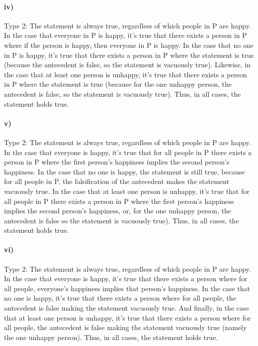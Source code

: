 \documentclass[10pt,letter]{article}
\begin{document}
\paragraph{iv)} Type 2: The statement is always true, regardless of which people in P are happy. In the case that everyone in P is happy, it's true that there exists a person in P where if the person is happy, then everyone in P is happy. In the case that no one in P is happy, it's true that there exists a person in P where the statement is true (because the antecedent is false, so the statement is vacuously true). Likewise, in the case that at least one person is unhappy, it's true that there exists a person in P where the statement is true (because for the one unhappy person, the antecedent is false, so the statement is vacuously true). Thus, in all cases, the statement holds true.

\paragraph{v)} Type 2: The statement is always true, regardless of which people in P are happy. In the case that everyone is happy, it's true that for all people in P there exists a person in P where the first person's happiness implies the second person's happiness. In the case that no one is happy, the statement is still true, because for all people in P, the falsification of the antecedent makes the statement vacuously true. In the case that at least one person is unhappy, it's true that for all people in P there exists a person in P where the first person's happiness implies the second person's happiness, or, for the one unhappy person, the antecedent is false so the statement is vacuously true). Thus, in all cases, the statement holds true.

\paragraph{vi)} Type 2: The statement is always true, regardless of which people in P are happy. In the case that everyone is happy, it's true that there exists a person where for all people, everyone's happiness implies that person's happiness. In the case that no one is happy, it's true that there exists a person where for all people, the antecedent is false making the statement vacuously true. And finally, in the case that at least one person is unhappy, it's true that there exists a person where for all people, the antecedent is false making the statement vacuously true (namely the one unhappy person). Thus, in all cases, the statement holds true.
\end{document}
